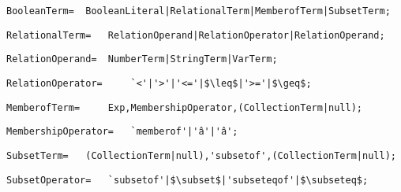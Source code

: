 \documentclass{article}
\begin{document}
    \begin{flushleft}
    \begin{lstlisting}[mathescape=true, breaklines=true]
      BooleanTerm= 	BooleanLiteral|RelationalTerm|MemberofTerm|SubsetTerm;
    \end{lstlisting}
    \end{flushleft}
    \begin{flushleft}
    \begin{lstlisting}[mathescape=true, breaklines=true]
      RelationalTerm= 	RelationOperand|RelationOperator|RelationOperand;
    \end{lstlisting}
    \end{flushleft}
    \begin{flushleft}
    \begin{lstlisting}[mathescape=true, breaklines=true]
      RelationOperand= 	NumberTerm|StringTerm|VarTerm;
    \end{lstlisting}
    \end{flushleft}
    \begin{flushleft}
    \begin{lstlisting}[mathescape=true, breaklines=true]
      RelationOperator= 	`<'|'>'|'<='|$\leq$|'>='|$\geq$;
    \end{lstlisting}
    \end{flushleft}
    \begin{flushleft}
    \begin{lstlisting}[mathescape=true, breaklines=true]
      MemberofTerm= 	Exp,MembershipOperator,(CollectionTerm|null);
    \end{lstlisting}
    \end{flushleft}
    \begin{flushleft}
    \begin{lstlisting}[mathescape=true, breaklines=true]
      MembershipOperator= 	`memberof'|'â'|'â';
    \end{lstlisting}
    \end{flushleft}
    \begin{flushleft}
    \begin{lstlisting}[mathescape=true, breaklines=true]
      SubsetTerm= 	(CollectionTerm|null),'subsetof',(CollectionTerm|null);
    \end{lstlisting}
    \end{flushleft}
    \begin{flushleft}
    \begin{lstlisting}[mathescape=true, breaklines=true]
      SubsetOperator= 	`subsetof'|$\subset$|'subseteqof'|$\subseteq$;
    \end{lstlisting}
    \end{flushleft}
\end{document}
